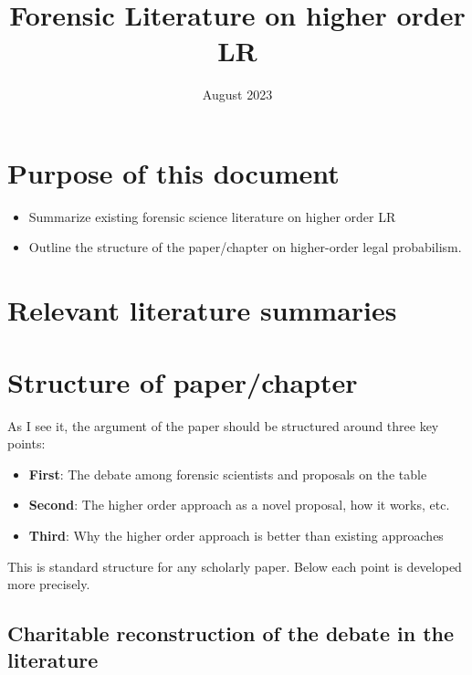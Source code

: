 \documentclass[
  10pt,
  dvipsnames,enabledeprecatedfontcommands]{scrartcl}
\title{Forensic Literature on higher order LR}
\author{}
\date{\vspace{-2.5em}August 2023}
\begin{document}
\maketitle

\hypertarget{purpose-of-this-document}{%
\section{Purpose of this document}\label{purpose-of-this-document}}

\begin{itemize}
\item
  Summarize existing forensic science literature on higher order LR
\item
  Outline the structure of the paper/chapter on higher-order legal
  probabilism.
\end{itemize}

\hypertarget{relevant-literature-summaries}{%
\section{Relevant literature
summaries}\label{relevant-literature-summaries}}

\hypertarget{structure-of-paperchapter}{%
\section{Structure of paper/chapter}\label{structure-of-paperchapter}}

As I see it, the argument of the paper should be structured around three
key points:

\begin{itemize}
\item
  \textbf{First}: The debate among forensic scientists and proposals on
  the table
\item
  \textbf{Second}: The higher order approach as a novel proposal, how it
  works, etc.
\item
  \textbf{Third}: Why the higher order approach is better than existing
  approaches
\end{itemize}

This is standard structure for any scholarly paper. Below each point is
developed more precisely.

\hypertarget{charitable-reconstruction-of-the-debate-in-the-literature}{%
\subsection{Charitable reconstruction of the debate in the
literature}\label{charitable-reconstruction-of-the-debate-in-the-literature}}
\end{document}

